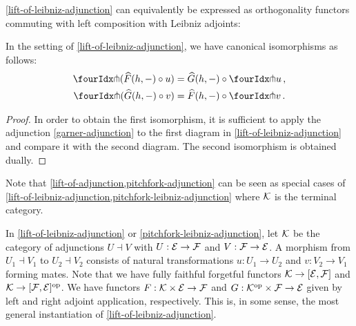 \documentclass[reqno,10pt,a4paper,oneside,draft]{amsart}
\begin{document}
\cref{lift-of-leibniz-adjunction} can equivalently be expressed as orthogonality functors commuting with left composition with Leibniz adjoints:

\begin{corollary} \label{pitchfork-leibniz-adjunction}
In the setting of \cref{lift-of-leibniz-adjunction}, we have canonical isomorphisms as follows:
\begin{align*}
  \liftr{(\widehat{F}(h, -) \cc u)} &= \widehat{G}(h, -) \cc \liftr{u}
\, ,\\
  \liftl{(\widehat{G}(h, -) \cc v)} &= \widehat{F}(h, -) \cc \liftl{v}
\, .
\end{align*}
\end{corollary}

\begin{proof}
In order to obtain the first isomorphism, it is sufficient to apply the adjunction \eqref{garner-adjunction} to the first diagram in \cref{lift-of-leibniz-adjunction} and compare it with the second diagram.
The second isomorphism is obtained dually.
\end{proof}

Note that \cref{lift-of-adjunction,pitchfork-adjunction} can be seen as special cases of \cref{lift-of-leibniz-adjunction,pitchfork-leibniz-adjunction} where $\cal{K}$ is the terminal category.

\begin{remark} \label{pitchfork-leibniz-most-general-example}
In \cref{lift-of-leibniz-adjunction} or \cref{pitchfork-leibniz-adjunction}, let $\cal{K}$ be the category of adjunctions $U \dashv V$ with $U : \cal{E} \to \cal{F}$ and $V : \cal{F} \to \cal{E}$.
A morphism from $U_1 \dashv V_1$ to $U_2 \dashv V_2$ consists of natural transformations $u : U_1 \to U_2$ and $v : V_2 \to V_1$ forming mates.
Note that we have fully faithful forgetful functors $\cal{K} \to [\cal{E}, \cal{F}]$ and $\cal{K} \to [\cal{F}, \cal{E}]^{\op}$.
We have functors $F : \cal{K} \times \cal{E} \to \cal{F}$ and $G : \cal{K}^{\op} \times \cal{F} \to \cal{E}$ given by left and right adjoint application, respectively.
This is, in some sense, the most general instantiation of \cref{lift-of-leibniz-adjunction}.
\end{remark}

\medskip
\end{document}
